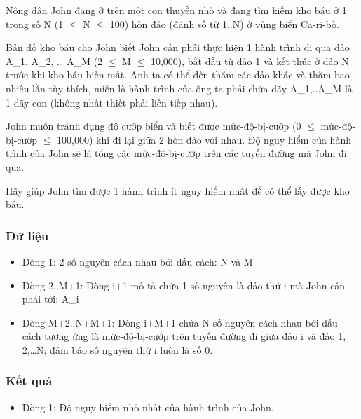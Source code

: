 



   Nông dân John đang ở trên một con thuyền nhỏ và đang tìm kiếm  kho báu ở 1 trong số N (1  $\le$  N  $\le$  100) hòn đảo (đánh số từ 1..N)  ở vùng biển Ca-ri-bò.  

   Bản đồ kho báu cho John biết John cần phải thực hiện 1 hành  trình đi qua đảo A\_1, A\_2, … A\_M (2  $\le$  M  $\le$  10,000), bắt đầu từ  đảo 1 và kết thúc ở đảo N trước khi kho báu biến mất. Anh ta có thể  đến thăm các đảo khác và thăm bao nhiêu lần tùy thích, miễn là hành  trình của ông ta phải chứa dãy A\_1,..A\_M là 1 dãy con (không nhất  thiết phải liên tiếp nhau).  

   John muốn tránh đụng độ cướp biển và biết được mức-độ-bị-cướp  (0  $\le$  mức-độ-bị-cướp  $\le$  100,000) khi đi lại giữa 2 hòn đảo với  nhau. Độ nguy hiểm của hành trình của John sẽ là tổng các mức-độ-bị-cướp  trên các tuyến đường mà John đi qua.  

   Hãy giúp John tìm được 1 hành trình ít nguy hiểm nhất để  có thể lấy được kho báu.  

\subsubsection{   Dữ liệu  }
\begin{itemize}
	\item     Dòng 1: 2 số nguyên cách nhau bởi dấu cách: N và M   
	\item     Dòng 2..M+1: Dòng i+1 mô tả chứa 1 số nguyên là đảo thứ i         mà John cần phải tới: A\_i   
	\item     Dòng M+2..N+M+1: Dòng i+M+1 chứa N số nguyên cách nhau bởi dấu cách         tương ứng là mức-độ-bị-cướp trên tuyến đường đi giữa đảo i và          đảo 1, 2,…N; đảm bảo số nguyên thứ i luôn là số 0.   
\end{itemize}

\subsubsection{   Kết quả  }
\begin{itemize}
	\item     Dòng 1: Độ nguy hiểm nhỏ nhất của hành trình của John.   
\end{itemize}

